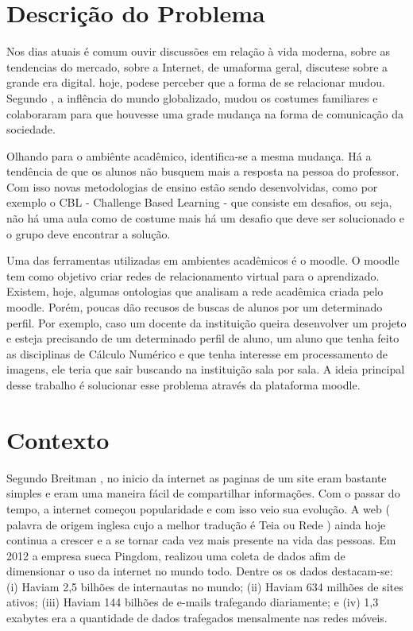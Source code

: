 \section{Descrição do Problema}
Nos dias atuais é comum ouvir discussões em relação à vida moderna, sobre as tendencias do mercado, sobre a Internet, de umaforma geral, discutese sobre a grande era digital. hoje, podese perceber que a forma de se relacionar mudou. Segundo \cite{FA}, a inflência do mundo globalizado, mudou os costumes familiares e colaboraram para que houvesse uma grade mudança na forma de comunicação da sociedade.

Olhando para o ambiênte acadêmico, identifica-se a mesma mudança. Há a tendência de que os alunos não busquem mais a resposta na pessoa do professor. Com isso novas metodologias de ensino estão sendo desenvolvidas, como por exemplo o CBL - Challenge Based Learning - que consiste em desafios, ou seja, não há uma aula como de costume mais há um desafio que deve ser solucionado e o grupo deve encontrar a solução\cite{CBL}.

Uma das ferramentas utilizadas em ambientes acadêmicos é o moodle. O moodle tem como objetivo criar redes de relacionamento virtual para o aprendizado. Existem, hoje, algumas ontologias que analisam a rede acadêmica criada pelo moodle. Porém, poucas dão recusos de buscas de alunos por um determinado perfil. Por exemplo, caso um docente da instituição queira desenvolver um projeto e esteja precisando de um determinado perfil de aluno, um aluno que tenha feito as disciplinas de Cálculo Numérico e que tenha interesse em processamento de imagens, ele teria que sair buscando na instituição sala por sala. A ideia principal desse trabalho é solucionar esse problema através da plataforma moodle.

\section{Contexto}

Segundo Breitman \cite{BK}, no inicio da internet as paginas de um site eram bastante simples e eram uma maneira fácil de compartilhar informações. Com o passar do tempo, a internet começou popularidade e com isso veio sua evolução. A web ( palavra de origem inglesa cujo a melhor tradução é Teia ou Rede ) ainda hoje continua a crescer e a se tornar cada vez mais presente na vida das pessoas.  Em 2012 a empresa sueca Pingdom, realizou uma coleta de dados afim de dimensionar o uso da internet no mundo todo. Dentre os os dados destacam-se: (i) Haviam 2,5 bilhões de internautas no mundo; (ii) Haviam 634 milhões de sites ativos; (iii) Haviam 144 bilhões de e-mails trafegando diariamente;  e (iv) 1,3 exabytes era a quantidade de dados trafegados mensalmente nas redes móveis.   

